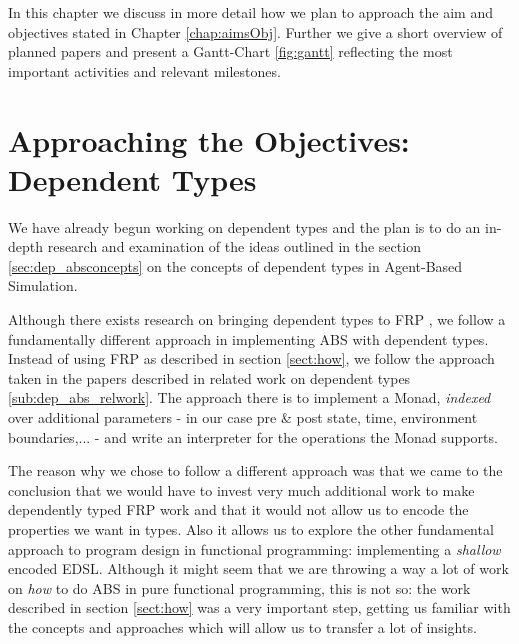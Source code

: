 
In this chapter we discuss in more detail how we plan to approach the aim and objectives stated in Chapter \ref{chap:aimsObj}. Further we give a short overview of planned papers and present a Gantt-Chart \ref{fig:gantt} reflecting the most important activities and relevant milestones.

\section{Approaching the Objectives: Dependent Types}
We have already begun working on dependent types and the plan is to do an in-depth research and examination of the ideas outlined in the section \ref{sec:dep_absconcepts} on the concepts of dependent types in Agent-Based Simulation.

Although there exists research on bringing dependent types to FRP \cite{sculthorpe_safe_2009}, we follow a fundamentally different approach in implementing ABS with dependent types. Instead of using FRP as described in section \ref{sect:how}, we follow the approach taken in the papers described in related work on dependent types \ref{sub:dep_abs_relwork}. The approach there is to implement a Monad, \textit{indexed} over additional parameters - in our case pre \& post state, time, environment boundaries,... - and write an interpreter for the operations the Monad supports.

The reason why we chose to follow a different approach was that we came to the conclusion that we would have to invest very much additional work to make dependently typed FRP work and that it would not allow us to encode the properties we want in types. Also it allows us to explore the other fundamental approach to program design in functional programming: implementing a \textit{shallow} encoded EDSL. Although it might seem that we are throwing a way a lot of work on \textit{how} to do ABS in pure functional programming, this is not so: the work described in section \ref{sect:how} was a very important step, getting us familiar with the concepts and approaches which will allow us to transfer a lot of insights. %

